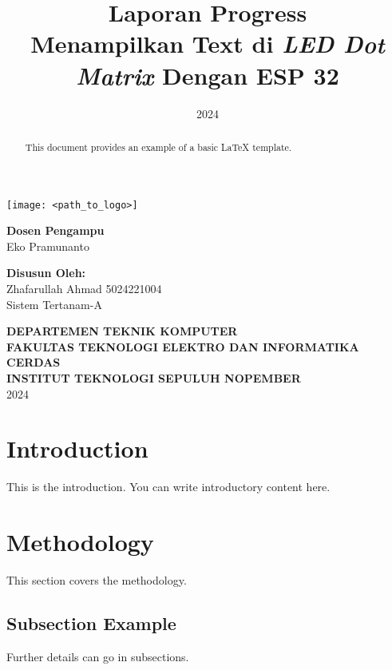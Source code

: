 \documentclass[a4paper,12pt]{article} %
\title{Laporan Progress\\Menampilkan Text di \textit{LED Dot Matrix} Dengan ESP 32}
\author{}
\date{2024}
\begin{document}
\begin{titlepage}
    \centering
    \vspace*{1cm}

    {\Large \thetitle\par}
    \vspace{2cm}

    \texttt{[image: <path\_to\_logo>]} %
    \vfill

    \vspace{1cm}
    \begin{onehalfspace}
    \textbf{Dosen Pengampu}\\
    Eko Pramunanto

    \vspace{1cm}

    \textbf{Disusun Oleh:}\\
    Zhafarullah Ahmad 5024221004\\
    Sistem Tertanam-A
    \end{onehalfspace}

    \vfill

    \textbf{DEPARTEMEN TEKNIK KOMPUTER\\
    FAKULTAS TEKNOLOGI ELEKTRO DAN INFORMATIKA CERDAS\\
    INSTITUT TEKNOLOGI SEPULUH NOPEMBER}\\
    2024
\end{titlepage}

\begin{abstract}
    This document provides an example of a basic LaTeX template. \lipsum[1]
\end{abstract}

\newpage
\tableofcontents
\newpage

\section{Introduction}
This is the introduction. You can write introductory content here. \lipsum[2-3]

\section{Methodology}
This section covers the methodology. \lipsum[4]

\subsection{Subsection Example}
Further details can go in subsections. \lipsum[5]
\end{document}
